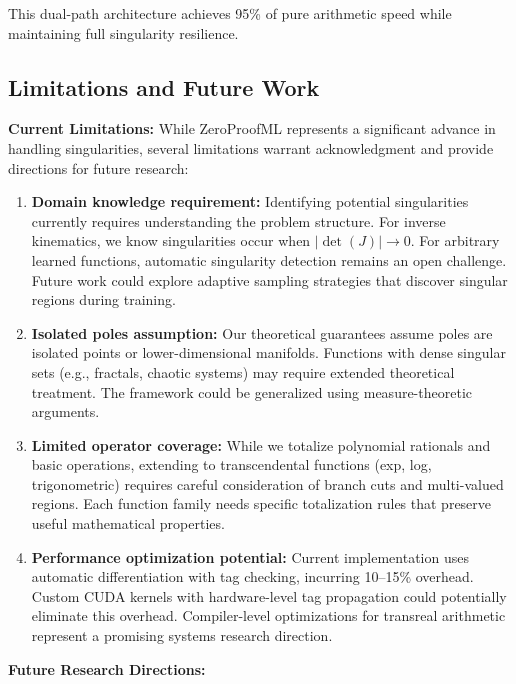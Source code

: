 \documentclass[twoside,11pt]{article}
\begin{document}
This dual-path architecture achieves 95\% of pure arithmetic speed while maintaining full singularity resilience.
\subsection{Limitations and Future Work}

\textbf{Current Limitations:}
While ZeroProofML represents a significant advance in handling singularities, several limitations warrant acknowledgment and provide directions for future research:

\begin{enumerate}
\item \textbf{Domain knowledge requirement:} Identifying potential singularities currently requires understanding the problem structure. For inverse kinematics, we know singularities occur when $|\det(J)| \to 0$. For arbitrary learned functions, automatic singularity detection remains an open challenge. Future work could explore adaptive sampling strategies that discover singular regions during training.

\item \textbf{Isolated poles assumption:} Our theoretical guarantees assume poles are isolated points or lower-dimensional manifolds. Functions with dense singular sets (e.g., fractals, chaotic systems) may require extended theoretical treatment. The framework could be generalized using measure-theoretic arguments.

\item \textbf{Limited operator coverage:} While we totalize polynomial rationals and basic operations, extending to transcendental functions (exp, log, trigonometric) requires careful consideration of branch cuts and multi-valued regions. Each function family needs specific totalization rules that preserve useful mathematical properties.

\item \textbf{Performance optimization potential:} Current implementation uses automatic differentiation with tag checking, incurring 10--15\% overhead. Custom CUDA kernels with hardware-level tag propagation could potentially eliminate this overhead. Compiler-level optimizations for transreal arithmetic represent a promising systems research direction.
\end{enumerate}

\textbf{Future Research Directions:}
\end{document}

